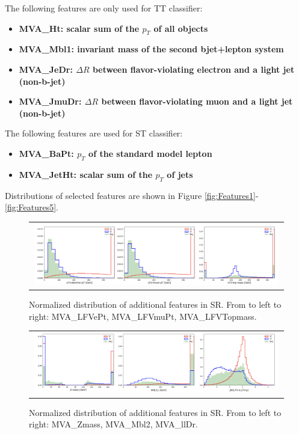 The following features are only used for TT classifier:

\begin{itemize}
\item \textbf{MVA\_Ht: scalar sum of the $p_T$ of all objects}
\item \textbf{MVA\_Mbl1: invariant mass of the second bjet+lepton system}
\item \textbf{MVA\_JeDr: $\Delta R$ between flavor-violating electron and a light jet (non-b-jet)}
\item \textbf{MVA\_JmuDr: $\Delta R$ between flavor-violating muon and a light jet (non-b-jet)}
\end{itemize}

The following features are used for ST classifier:

\begin{itemize}
\item \textbf{MVA\_BaPt: $p_T$ of the standard model lepton}
\item \textbf{MVA\_JetHt: scalar sum of the $p_T$ of jets}
\end{itemize}

Distributions of selected features are shown in Figure \ref{fig:Features1}-\ref{fig:Features5}.

\begin{figure}[tbh!]
 \begin{center}
 \begin{tabular}{c}
  \includegraphics[width=0.99\textwidth]{figures/Part3/BDT/Features2}\\
 \end{tabular}
 \caption{Normalized distribution of additional features in SR. From to left to right: MVA\_LFVePt, MVA\_LFVmuPt, MVA\_LFVTopmass.}
 \label{fig:Features2}
 \end{center}
\end{figure}

\begin{figure}[tbh!]
 \begin{center}
 \begin{tabular}{c}
  \includegraphics[width=0.99\textwidth]{figures/Part3/BDT/Features3}\\
 \end{tabular}
 \caption{Normalized distribution of additional features in SR. From to left to right: MVA\_Zmass, MVA\_Mbl2, MVA\_llDr.}
 \label{fig:Features3}
 \end{center}
\end{figure}

